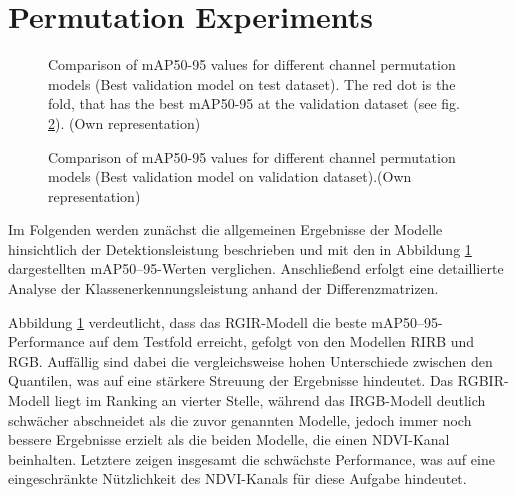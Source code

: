 \section{Permutation Experiments}
\begin{figure}[t]
    \centering
    
    \caption[Comparison of \acrshort{mAP}50-95 values for different channel permutation models (Best validation model on test dataset)]{Comparison of \acrshort{mAP}50-95 values for different channel permutation models (Best validation model on test dataset). The red dot is the fold, that has the best \acrshort{mAP}50-95 at the validation dataset (see fig. \ref{fig:perm_exp_map50-95:val_on_val}). (Own representation)}
    \label{fig:perm_exp_map50-95:val_on_test}
\end{figure}

\begin{figure}[b]
    \centering
    
    \caption[Comparison of \acrshort{mAP}50-95 values for different channel permutation models (Best validation model on validation dataset)]{Comparison of \acrshort{mAP}50-95 values for different channel permutation models (Best validation model on validation dataset).(Own representation)}
    \label{fig:perm_exp_map50-95:val_on_val}
\end{figure}
Im Folgenden werden zunächst die allgemeinen Ergebnisse der Modelle hinsichtlich der Detektionsleistung beschrieben und mit den in Abbildung \ref{fig:perm_exp_map50-95:val_on_test} dargestellten \acrshort{mAP}50--95-Werten verglichen. Anschließend erfolgt eine detaillierte Analyse der Klassenerkennungsleistung anhand der Differenzmatrizen.  

Abbildung \ref{fig:perm_exp_map50-95:val_on_test} verdeutlicht, dass das RGIR-Modell die beste \acrshort{mAP}50--95-Performance auf dem Testfold erreicht, gefolgt von den Modellen RIRB und RGB. Auffällig sind dabei die vergleichsweise hohen Unterschiede zwischen den Quantilen, was auf eine stärkere Streuung der Ergebnisse hindeutet. Das RGBIR-Modell liegt im Ranking an vierter Stelle, während das IRGB-Modell deutlich schwächer abschneidet als die zuvor genannten Modelle, jedoch immer noch bessere Ergebnisse erzielt als die beiden Modelle, die einen NDVI-Kanal beinhalten. Letztere zeigen insgesamt die schwächste Performance, was auf eine eingeschränkte Nützlichkeit des NDVI-Kanals für diese Aufgabe hindeutet.  

